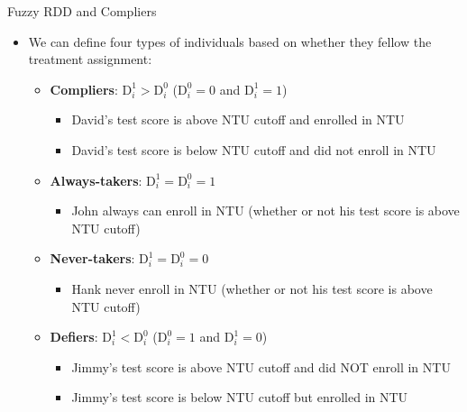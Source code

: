 \documentclass[dvipsnames,hyperref={pdfpagelabels=false}]{beamer}
\begin{document}
\begin{frame}{Fuzzy RDD and Compliers}
	\begin{itemize}
		
		\item We can define four types of individuals based on whether they fellow the treatment assignment:
		\vspace{0.2cm}
		\begin{itemize}
			\vspace{0.3cm}
			\item \textbf{Compliers}: $\mathrm{D}^{1}_{i}>\mathrm{D}^{0}_{i}$ ($\mathrm{D}^{0}_{i}=0$ and $\mathrm{D}^{1}_{i}=1$)
			\begin{itemize}
				\item David's test score is above NTU cutoff and enrolled in NTU 
				\vspace{0.2cm}
				\item David's test score is below NTU cutoff and did not enroll in NTU 
			\end{itemize}
			\item \textbf{Always-takers}: $\mathrm{D}^{1}_{i}=\mathrm{D}^{0}_{i}=1$
			\begin{itemize}
				\item John always can enroll in NTU (whether or not his test score is above NTU cutoff)
				\vspace{0.2cm}
			\end{itemize}			
			\item \textbf{Never-takers}: $\mathrm{D}^{1}_{i}=\mathrm{D}^{0}_{i}=0$
			\begin{itemize}
				\item Hank never enroll in NTU (whether or not his test score is above NTU cutoff)
				\vspace{0.2cm}
			\end{itemize}			
			\item \textbf{Defiers}: $\mathrm{D}^{1}_{i}<\mathrm{D}^{0}_{i}$ ($\mathrm{D}^{0}_{i}=1$ and $\mathrm{D}^{1}_{i}=0$)
			\begin{itemize}
				\item Jimmy's test score is above NTU cutoff and did NOT enroll in NTU  
				\vspace{0.2cm}
				\item Jimmy's test score is below NTU cutoff but enrolled in NTU  
			\end{itemize}
			
			
		\end{itemize}
		
	\end{itemize}
\end{frame}
\end{document}
